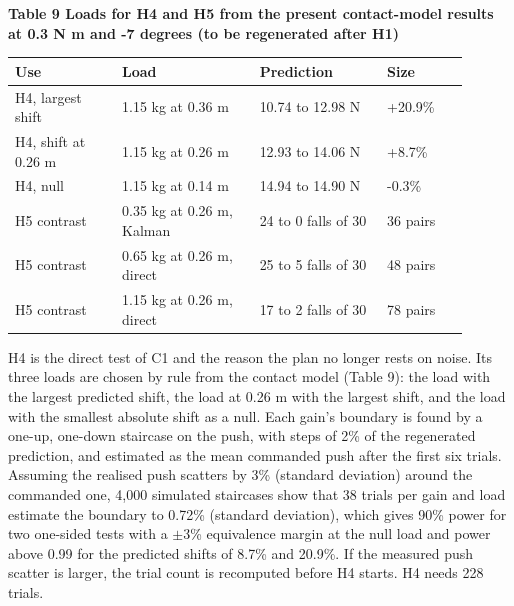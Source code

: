 \documentclass[11pt,a4paper]{article}
\begin{document}
\textbf{Table 9 Loads for H4 and H5 from the present contact-model results at 0.3 N m and -7 degrees (to be regenerated after H1)}
\begin{longtable}{p{0.216\linewidth}p{0.27\linewidth}p{0.252\linewidth}p{0.162\linewidth}}
\toprule
Use & Load & Prediction & Size \\ \midrule \endhead
H4, largest shift & 1.15 kg at 0.36 m & 10.74 to 12.98 N & +20.9\% \\
H4, shift at 0.26 m & 1.15 kg at 0.26 m & 12.93 to 14.06 N & +8.7\% \\
H4, null & 1.15 kg at 0.14 m & 14.94 to 14.90 N & -0.3\% \\
H5 contrast & 0.35 kg at 0.26 m, Kalman & 24 to 0 falls of 30 & 36 pairs \\
H5 contrast & 0.65 kg at 0.26 m, direct & 25 to 5 falls of 30 & 48 pairs \\
H5 contrast & 1.15 kg at 0.26 m, direct & 17 to 2 falls of 30 & 78 pairs \\
\bottomrule
\end{longtable}
H4 is the direct test of C1 and the reason the plan no longer rests on noise. Its three loads are chosen by rule from the contact model (Table 9): the load with the largest predicted shift, the load at 0.26 m with the largest shift, and the load with the smallest absolute shift as a null. Each gain's boundary is found by a one-up, one-down staircase on the push, with steps of 2\% of the regenerated prediction, and estimated as the mean commanded push after the first six trials. Assuming the realised push scatters by 3\% (standard deviation) around the commanded one, 4,000 simulated staircases show that 38 trials per gain and load estimate the boundary to 0.72\% (standard deviation), which gives 90\% power for two one-sided tests with a \ensuremath{\pm}3\% equivalence margin at the null load and power above 0.99 for the predicted shifts of 8.7\% and 20.9\%. If the measured push scatter is larger, the trial count is recomputed before H4 starts. H4 needs 228 trials.
\end{document}
